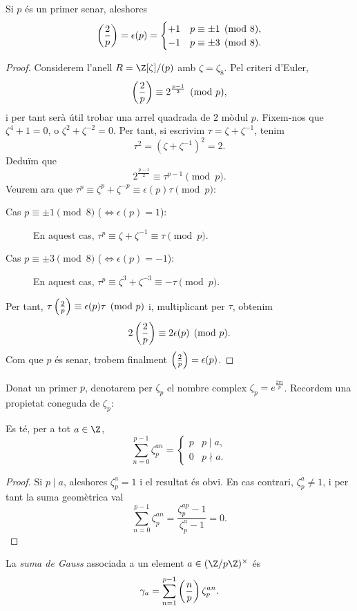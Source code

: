 \begin{proposition}
Si $p$ és un primer senar, aleshores
\[
\left(\frac{2}{p}\right)=\epsilon(p)=\begin{cases}
+1&p\equiv \pm 1\pmod{8},\\
-1&p\equiv \pm 3 \pmod{8}.
\end{cases}
\]
\end{proposition}
\begin{proof}
Considerem l'anell $R=\Z[\zeta]/(p)$ amb $\zeta=\zeta_8$. Pel criteri d'Euler,
\[
\left(\frac{2}{p}\right)\equiv 2^{\frac{p-1}{2}}\pmod p,
\]
i per tant serà útil trobar una arrel quadrada de $2$ mòdul $p$. Fixem-nos que $\zeta^4+1=0$, o $\zeta^2+\zeta^{-2}=0$. Per tant, si escrivim $\tau=\zeta+\zeta^{-1}$, tenim
\[
\tau^2 = (\zeta+\zeta^{-1})^2= 2.
\]
Deduïm que
\[
2^{\frac{p-1}{2}}\equiv \tau^{p-1}\pmod p.
\]
Veurem ara que $\tau^p\equiv \zeta^p+\zeta^{-p}\equiv \epsilon(p)\tau\pmod p$:
\begin{description}
\item[Cas $p\equiv \pm 1\pmod 8$ ($\iff \epsilon(p)=1$):] En aquest cas, $\tau^p\equiv \zeta+\zeta^{-1}\equiv \tau\pmod p$.
\item[Cas $p\equiv \pm 3\pmod 8$ ($\iff \epsilon(p)=-1$):] En aquest cas, $\tau^p\equiv \zeta^3+\zeta^{-3}\equiv -\tau\pmod p$.
\end{description}
Per tant, $\tau \left(\frac{2}{p}\right) \equiv \epsilon(p) \tau \pmod p$ i, multiplicant per $\tau$, obtenim
\[
2\left(\frac{2}{p}\right)\equiv 2\epsilon(p)\pmod p.
\]
Com que $p$ és senar, trobem finalment $\left(\frac{2}{p}\right)=\epsilon(p)$.
\end{proof}


Donat un primer $p$, denotarem per $\zeta_p$ el nombre complex $\zeta_p=e^{\frac{2\pi i}{p}}$. Recordem una propietat coneguda de $\zeta_p$:

\begin{lemma}
Es té, per a tot $a\in \Z$,
\[
\sum_{n=0}^{p-1} \zeta_p^{an}=\begin{cases}
p& p\mid a,\\
0& p\nmid a.
\end{cases}
\]
\end{lemma}
\begin{proof}
Si $p\mid a$, aleshores $\zeta_p^a=1$ i el resultat és obvi. En cas contrari, $\zeta_p^a\neq 1$, i per tant la suma geomètrica val
\[
\sum_{n=0}^{p-1} \zeta_p^{an} = \frac{\zeta_p^{ap}-1}{\zeta_p^a-1}=0.
\]
\end{proof}

\begin{definition}
 La \emph{suma de Gauss} associada a un element $a\in (\Z/p\Z)^\times$ és
 \[
 \gamma_a = \sum_{n=1}^{p-1}\left(\frac{n}{p}\right) \zeta_p^{an}.
 \]
\end{definition}

